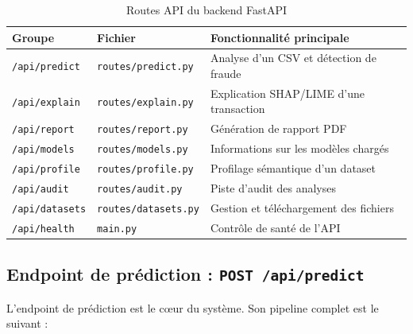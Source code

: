 \documentclass[12pt,a4paper,twoside]{report}
\begin{document}
\begin{table}[H]
\centering
\caption{Routes API du backend FastAPI}
\label{tab:routes}
\begin{tabular}{lll}
\toprule
\textbf{Groupe}           & \textbf{Fichier}            & \textbf{Fonctionnalité principale} \\
\midrule
\texttt{/api/predict}     & \texttt{routes/predict.py}  & Analyse d'un CSV et détection de fraude \\
\texttt{/api/explain}     & \texttt{routes/explain.py}  & Explication SHAP/LIME d'une transaction \\
\texttt{/api/report}      & \texttt{routes/report.py}   & Génération de rapport PDF \\
\texttt{/api/models}      & \texttt{routes/models.py}   & Informations sur les modèles chargés \\
\texttt{/api/profile}     & \texttt{routes/profile.py}  & Profilage sémantique d'un dataset \\
\texttt{/api/audit}       & \texttt{routes/audit.py}    & Piste d'audit des analyses \\
\texttt{/api/datasets}    & \texttt{routes/datasets.py} & Gestion et téléchargement des fichiers \\
\texttt{/api/health}      & \texttt{main.py}            & Contrôle de santé de l'API \\
\bottomrule
\end{tabular}
\end{table}

\subsection{Endpoint de prédiction : \texttt{POST /api/predict}}

L'endpoint de prédiction est le cœur du système. Son pipeline complet est le suivant :
\end{document}

